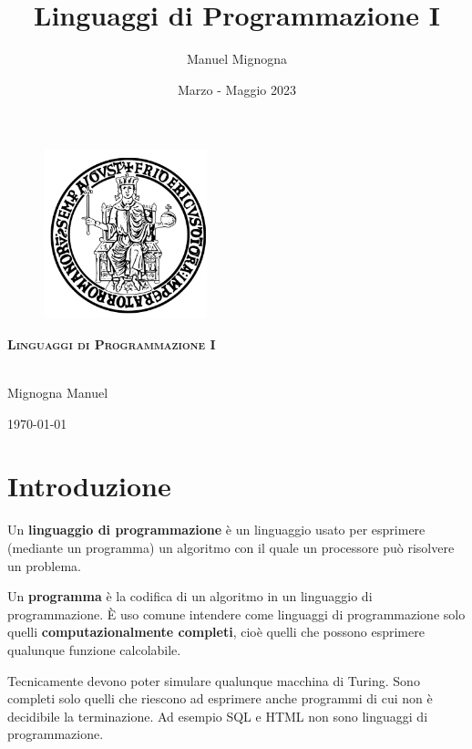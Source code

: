 \documentclass[10pt]{article}
\title{Linguaggi di Programmazione I}
\author{Manuel Mignogna}
\date{Marzo - Maggio 2023}
\begin{document}
\begin{figure}[htbp!!]
        \begin{center}
            \includegraphics[width=.25\textwidth]{Immagini/FedericoII.png}
        \end{center}
    \end{figure}

    \begin{center}
        {\scshape\Large\bfseries Linguaggi di Programmazione I}\\\
    \end{center}
    \begin{center}
    
        Mignogna Manuel
        
    \end{center}
    \begin{center}
        \today 
    \end{center}
\tableofcontents



\section{Introduzione}
Un \textbf{linguaggio di programmazione} è un linguaggio usato per esprimere (mediante un programma) un algoritmo con il quale un processore può risolvere un problema.

Un \textbf{programma} è la codifica di un algoritmo in un linguaggio di programmazione.
È uso comune intendere come linguaggi di programmazione solo quelli \textbf{computazionalmente completi}, cioè quelli che possono esprimere qualunque funzione calcolabile.

Tecnicamente devono poter simulare qualunque macchina di Turing. Sono completi solo quelli che riescono ad esprimere anche programmi di cui non è decidibile la terminazione.
Ad esempio SQL e HTML non sono linguaggi di programmazione.
\end{document}
